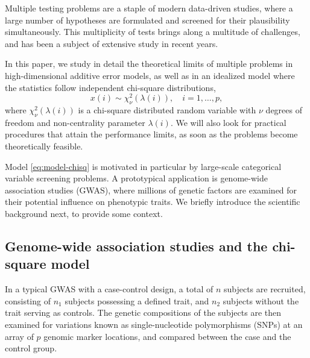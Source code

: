
Multiple testing problems are a staple of modern data-driven studies, where a large number of hypotheses are formulated and screened for their plausibility simultaneously.
This multiplicity of tests brings along a multitude of challenges, and has been a subject of extensive study in recent years.


In this paper, we study in detail the theoretical limits of multiple problems in high-dimensional additive error models, as well as in an idealized model where the statistics follow independent chi-square distributions,
\begin{equation} \label{eq:model-chisq}
    x(i) \sim \chi_\nu^2\left(\lambda(i)\right), \quad i=1,\ldots,p,
\end{equation}
where $\chi_\nu^2\left(\lambda(i)\right)$ is a chi-square distributed random variable with $\nu$ degrees of freedom and non-centrality parameter $\lambda(i)$.
We will also look for practical procedures that attain the performance limits, as soon as the problems become theoretically feasible.


Model \eqref{eq:model-chisq} is motivated in particular by large-scale categorical variable screening problems.
A prototypical application is genome-wide association studies (GWAS), where millions of genetic factors are examined for their potential influence on phenotypic traits.
We briefly introduce the scientific background next, to provide some context.

\subsection{Genome-wide association studies and the chi-square model}
\label{subsec:motivation-chisq}

% 
In a typical GWAS with a case-control design, a total of $n$ subjects are recruited,  consisting of $n_1$ subjects possessing a defined trait, and $n_2$ subjects without the trait serving as controls.
The genetic compositions of the subjects are then examined for variations known as single-nucleotide polymorphisms (SNPs) at an array of $p$ genomic marker locations, and compared between the case and the control group.

